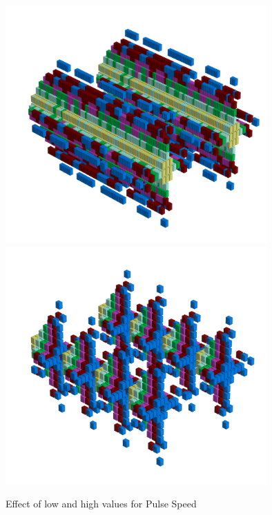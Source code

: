 \clearpage
\begin{figure}[H]
    \centering
    \begin{adjustbox}{width=15cm,center}
      \includegraphics[width=10cm]{src/pulsespeed/pattern0-45.png}%
      \includegraphics[width=10cm]{src/pulsespeed/pattern1-45.png}%
    \end{adjustbox}
    \caption{Effect of low and high values for Pulse Speed}
\end{figure}
